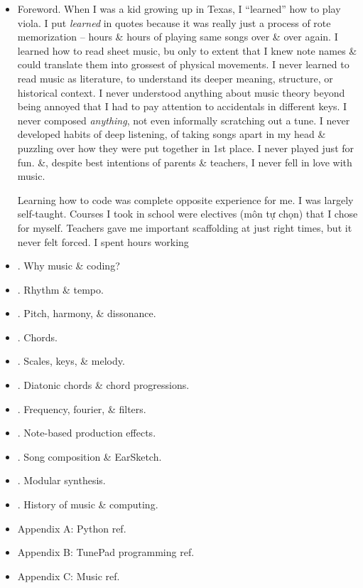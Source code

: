 \documentclass{article}
\begin{document}
\begin{itemize}
	{\sc Melanie West} is a PhD student in Learning Sciences at Northwestern University \& co-founder of Tiz Media Foundation, a nonprofit dedicated to empowering underrepresented youth through science, technology, engineering, \& mathematics (STEM) programs.
	
	{\sc Cameron Roberts} is a software developer \& musician living in Chicago. He holds degrees from Northwestern University in Music Performance \& CS.
	\item {\sf Foreword.} When I was a kid growing up in Texas, I ``learned'' how to play viola. I put {\it learned} in quotes because it was really just a process of rote memorization -- hours \& hours of playing same songs over \& over again. I learned how to read sheet music, bu only to extent that I knew note names \& could translate them into grossest of physical movements. I never learned to read music as literature, to understand its deeper meaning, structure, or historical context. I never understood anything about music theory beyond being annoyed that I had to pay attention to accidentals in different keys. I never composed {\it anything}, not even informally scratching out a tune. I never developed habits of deep listening, of taking songs apart in my head \& puzzling over how they were put together in 1st place. I never played just for fun. \&, despite best intentions of parents \& teachers, I never fell in love with music.
	
	Learning how to code was complete opposite experience for me. I was largely self-taught. Courses I took in school were electives (môn tự chọn) that I chose for myself. Teachers gave me important scaffolding at just right times, but it never felt forced. I spent hours working
	\item {. Why music \& coding?}
	\item {. Rhythm \& tempo.}
	\item {. Pitch, harmony, \& dissonance.}
	\item {. Chords.}
	\item {. Scales, keys, \& melody.}
	\item {. Diatonic chords \& chord progressions.}
	\item {. Frequency, fourier, \& filters.}
	\item {. Note-based production effects.}
	\item {. Song composition \& EarSketch.}
	\item {. Modular synthesis.}
	\item {. History of music \& computing.}
	\item {\sf Appendix A: Python ref.}
	\item {\sf Appendix B: TunePad programming ref.}
	\item {\sf Appendix C: Music ref.}
\end{itemize}
\end{document}

